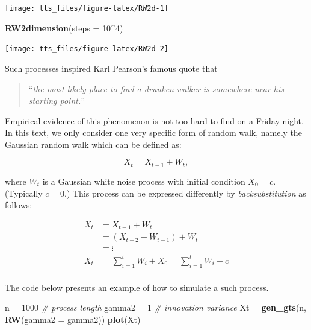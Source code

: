 \documentclass[]{book}
\newenvironment{Shaded}{\begin{snugshade}}{\end{snugshade}}
\newcommand{\CommentTok}[1]{\textcolor[rgb]{0.56,0.35,0.01}{\textit{#1}}}
\newcommand{\DataTypeTok}[1]{\textcolor[rgb]{0.13,0.29,0.53}{#1}}
\newcommand{\DecValTok}[1]{\textcolor[rgb]{0.00,0.00,0.81}{#1}}
\newcommand{\KeywordTok}[1]{\textcolor[rgb]{0.13,0.29,0.53}{\textbf{#1}}}
\newcommand{\NormalTok}[1]{#1}
\newcommand{\OperatorTok}[1]{\textcolor[rgb]{0.81,0.36,0.00}{\textbf{#1}}}
\newcommand{\StringTok}[1]{\textcolor[rgb]{0.31,0.60,0.02}{#1}}
\theoremstyle{definition}
\theoremstyle{definition}
\theoremstyle{definition}
\theoremstyle{remark}
\begin{document}
\begin{center}\texttt{[image: tts\_files/figure-latex/RW2d-1]} \end{center}

\begin{Shaded}
\begin{Highlighting}[]
\KeywordTok{RW2dimension}\NormalTok{(}\DataTypeTok{steps =} \DecValTok{10}\OperatorTok{^}\DecValTok{4}\NormalTok{)}
\end{Highlighting}
\end{Shaded}

\begin{center}\texttt{[image: tts\_files/figure-latex/RW2d-2]} \end{center}

Such processes inspired Karl Pearson's famous quote that

\begin{quote}
``\emph{the most likely place to find a drunken walker is somewhere near
his starting point.}''
\end{quote}

Empirical evidence of this phenomenon is not too hard to find on a
Friday night. In this text, we only consider one very specific form of
random walk, namely the Gaussian random walk which can be defined as:

\[X_t = X_{t-1} + W_t,\]

where \(W_t\) is a Gaussian white noise process with initial condition
\(X_0 = c\). (Typically \(c = 0\).) This process can be expressed
differently by \emph{backsubstitution} as follows:

\[\begin{aligned}
  {X_t} &= {X_{t - 1}} + {W_t} \\
   &= \left( {{X_{t - 2}} + {W_{t - 1}}} \right) + {W_t} \\
   &= \vdots \\
  {X_t} &= \sum\limits_{i = 1}^t {{W_i}} + X_0 =  \sum\limits_{i = 1}^t {{W_i}} + c \\ 
\end{aligned} \]

The code below presents an example of how to simulate a such process.

\begin{Shaded}
\begin{Highlighting}[]
\NormalTok{n =}\StringTok{ }\DecValTok{1000}                               \CommentTok{# process length}
\NormalTok{gamma2 =}\StringTok{ }\DecValTok{1}                             \CommentTok{# innovation variance}
\NormalTok{Xt =}\StringTok{ }\KeywordTok{gen_gts}\NormalTok{(n, }\KeywordTok{RW}\NormalTok{(}\DataTypeTok{gamma2 =}\NormalTok{ gamma2))}
\KeywordTok{plot}\NormalTok{(Xt)}
\end{Highlighting}
\end{Shaded}
\end{document}
